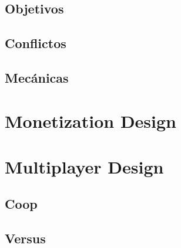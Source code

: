     \subsection{Objetivos}
    \subsection{Conflictos}
    \subsection{Mecánicas}

\section{Monetization Design}

\section{Multiplayer Design} \label{multiplayer}
    \subsection{Coop}
    \subsection{Versus}


